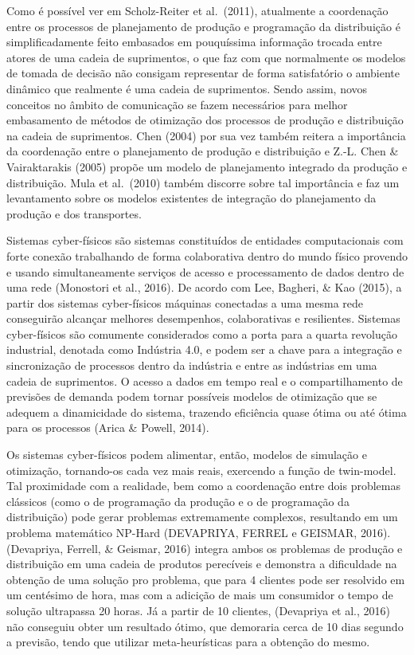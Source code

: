 \documentclass[
]{book}
\begin{document}
Como é possível ver em Scholz-Reiter et al.~(2011), atualmente a coordenação entre os processos de planejamento de produção e programação da distribuição é simplificadamente feito embasados em pouquíssima informação trocada entre atores de uma cadeia de suprimentos, o que faz com que normalmente os modelos de tomada de decisão não consigam representar de forma satisfatório o ambiente dinâmico que realmente é uma cadeia de suprimentos. Sendo assim, novos conceitos no âmbito de comunicação se fazem necessários para melhor embasamento de métodos de otimização dos processos de produção e distribuição na cadeia de suprimentos. Chen (2004) por sua vez também reitera a importância da coordenação entre o planejamento de produção e distribuição e Z.-L. Chen \& Vairaktarakis (2005) propõe um modelo de planejamento integrado da produção e distribuição. Mula et al.~(2010) também discorre sobre tal importância e faz um levantamento sobre os modelos existentes de integração do planejamento da produção e dos transportes.

Sistemas cyber-físicos são sistemas constituídos de entidades computacionais com forte conexão trabalhando de forma colaborativa dentro do mundo físico provendo e usando simultaneamente serviços de acesso e processamento de dados dentro de uma rede (Monostori et al., 2016). De acordo com Lee, Bagheri, \& Kao (2015), a partir dos sistemas cyber-físicos máquinas conectadas a uma mesma rede conseguirão alcançar melhores desempenhos, colaborativas e resilientes. Sistemas cyber-físicos são comumente considerados como a porta para a quarta revolução industrial, denotada como Indústria 4.0, e podem ser a chave para a integração e sincronização de processos dentro da indústria e entre as indústrias em uma cadeia de suprimentos. O acesso a dados em tempo real e o compartilhamento de previsões de demanda podem tornar possíveis modelos de otimização que se adequem a dinamicidade do sistema, trazendo eficiência quase ótima ou até ótima para os processos (Arica \& Powell, 2014).

Os sistemas cyber-físicos podem alimentar, então, modelos de simulação e otimização, tornando-os cada vez mais reais, exercendo a função de twin-model. Tal proximidade com a realidade, bem como a coordenação entre dois problemas clássicos (como o de programação da produção e o de programação da distribuição) pode gerar problemas extremamente complexos, resultando em um problema matemático NP-Hard (DEVAPRIYA, FERREL e GEISMAR, 2016). (Devapriya, Ferrell, \& Geismar, 2016) integra ambos os problemas de produção e distribuição em uma cadeia de produtos perecíveis e demonstra a dificuldade na obtenção de uma solução pro problema, que para 4 clientes pode ser resolvido em um centésimo de hora, mas com a adicição de mais um consumidor o tempo de solução ultrapassa 20 horas. Já a partir de 10 clientes, (Devapriya et al., 2016) não conseguiu obter um resultado ótimo, que demoraria cerca de 10 dias segundo a previsão, tendo que utilizar meta-heurísticas para a obtenção do mesmo.
\end{document}
